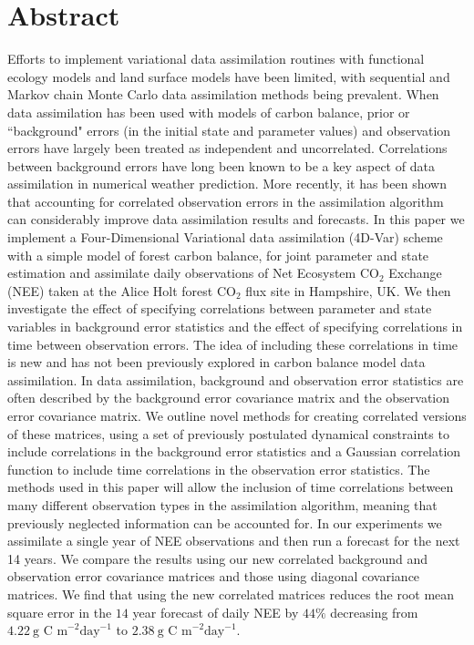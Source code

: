 
\section{Abstract}
Efforts to implement variational data assimilation routines with functional ecology models and land surface models have been limited, with sequential and Markov chain Monte Carlo data assimilation methods being prevalent. When data assimilation has been used with models of carbon balance, prior or ``background" errors (in the initial state and parameter values) and observation errors have largely been treated as independent and uncorrelated. Correlations between background errors have long been known to be a key aspect of data assimilation in numerical weather prediction. More recently, it has been shown that accounting for correlated observation errors in the assimilation algorithm can considerably improve data assimilation results and forecasts. In this paper we implement a Four-Dimensional Variational data assimilation (4D-Var) scheme with a simple model of forest carbon balance, for joint parameter and state estimation and assimilate daily observations of Net Ecosystem $\text{CO}_{2}$ Exchange (NEE) taken at the Alice Holt forest $\text{CO}_2$ flux site in Hampshire, UK. We then investigate the effect of specifying correlations between parameter and state variables in background error statistics and the effect of specifying correlations in time between observation errors. The idea of including these correlations in time is new and has not been previously explored in carbon balance model data assimilation. In data assimilation, background and observation error statistics are often described by the background error covariance matrix and the observation error covariance matrix. We outline novel methods for creating correlated versions of these matrices, using a set of previously postulated dynamical constraints to include correlations in the background error statistics and a Gaussian correlation function to include time correlations in the observation error statistics. The methods used in this paper will allow the inclusion of time correlations between many different observation types in the assimilation algorithm, meaning that previously neglected information can be accounted for. In our experiments we assimilate a single year of NEE observations and then run a forecast for the next 14 years. We compare the results using our new correlated background and observation error covariance matrices and those using diagonal covariance matrices. We find that using the new correlated matrices reduces the root mean square error in the $14$ year forecast of daily NEE by $44\%$ decreasing from $4.22~\text{g C m}^{-2}\text{day}^{-1}$ to $2.38~\text{g C m}^{-2}\text{day}^{-1}$.     

